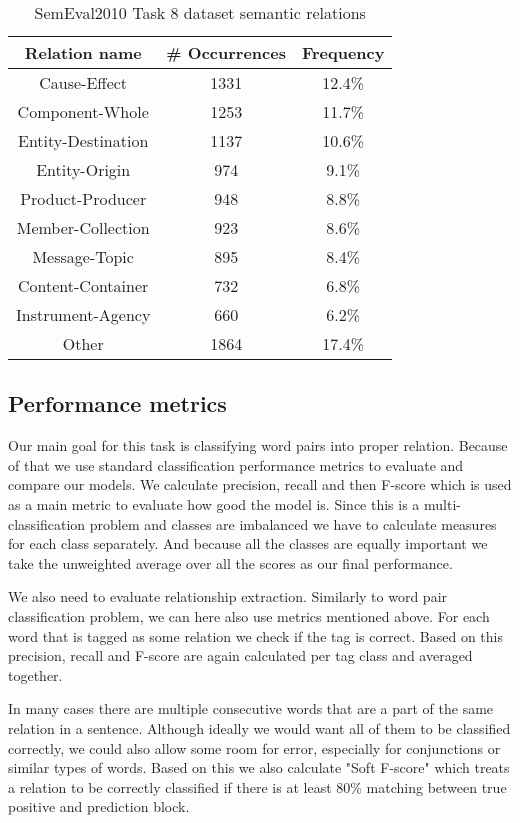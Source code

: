 \documentclass[fleqn,moreauthors,10pt]{ds_report}
\begin{document}
\begin{table}[h]
    \centering
    \begin{tabular}{|c|c|c|}
    \hline
        \textbf{Relation name} & \textbf{\# Occurrences} & \textbf{Frequency} \\ \hline \hline
        Cause-Effect & 1331 & 12.4\% \\ \hline
        Component-Whole & 1253 & 11.7\% \\ \hline
        Entity-Destination & 1137 & 10.6\% \\ \hline
        Entity-Origin & 974 & 9.1\% \\ \hline
        Product-Producer & 948 & 8.8\% \\ \hline
        Member-Collection & 923 & 8.6\% \\ \hline
        Message-Topic & 895 & 8.4\% \\ \hline
        Content-Container & 732 & 6.8\% \\ \hline
        Instrument-Agency & 660 & 6.2\% \\ \hline
        Other & 1864 & 17.4\% \\ \hline
    \end{tabular}
    \caption{SemEval2010 Task 8 dataset semantic relations}
    \label{tab:semeval}
\end{table}

\subsection{Performance metrics}
\par Our main goal for this task is classifying word pairs into proper relation. Because of that we use standard classification performance metrics to evaluate and compare our models. We calculate precision, recall and then F-score which is used as a main metric to evaluate how good the model is. Since this is a multi-classification problem and classes are imbalanced we have to calculate measures for each class separately. And because all the classes are equally important we take the unweighted average over all the scores as our final performance. 
\par We also need to evaluate relationship extraction. Similarly to word pair classification problem, we can here also use metrics mentioned above. For each word that is tagged as some relation we check if the tag is correct. Based on this precision, recall and F-score are again calculated per tag class and averaged together. %
\par In many cases there are multiple consecutive words that are a part of the same relation in a sentence. Although ideally we would want all of them to be classified correctly, we could also allow some room for error, especially for conjunctions or similar types of words. Based on this we also calculate "Soft F-score" which treats a relation to be correctly classified if there is at least 80\% matching between true positive and prediction block.
\end{document}
